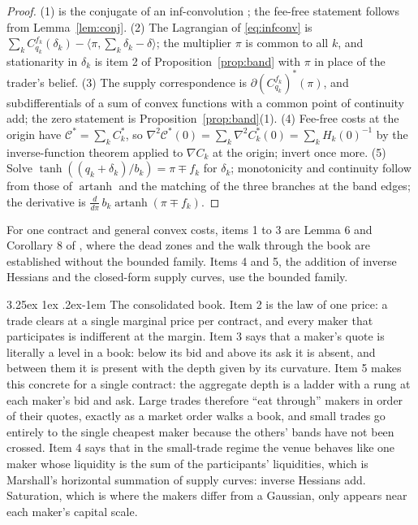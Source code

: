 \documentclass[11pt]{article}
\makeatletter
\renewcommand\paragraph{\@startsection{paragraph}{4}{\z@}%
  {3.25ex \@plus1ex \@minus.2ex}{-1em}%
  {\normalfont\normalsize\itshape}}
\theoremstyle{definition}
\theoremstyle{remark}
\newcommand{\ip}[2]{\langle #1,#2\rangle}
\newcommand{\artanh}{\operatorname{artanh}}
\makeatother
\begin{document}
\begin{proof}
(1) is the conjugate of an inf-convolution \citep[Thm.\ 16.4]{rockafellar1970}; the fee-free statement follows from
Lemma~\ref{lem:conj}. (2) The Lagrangian of \eqref{eq:infconv} is $\sum_kC^{f_k}_{q_k}(\delta_k)-\ip{\pi}{\sum_k\delta_k-\delta}$;
the multiplier $\pi$ is common to all $k$, and stationarity in $\delta_k$ is item 2 of Proposition~\ref{prop:band}
with $\pi$ in place of the trader's belief. (3) The supply correspondence is $\partial(C^{f_k}_{q_k})^{*}(\pi)$, and
subdifferentials of a sum of convex functions with a common point of continuity add; the zero statement is
Proposition~\ref{prop:band}(1). (4) Fee-free costs at the origin have $\mathcal{C}^{*}=\sum_kC_k^{*}$, so
$\nabla^2\mathcal{C}^{*}(0)=\sum_k\nabla^2C_k^{*}(0)=\sum_kH_k(0)^{-1}$ by the inverse-function theorem applied to
$\nabla C_k$ at the origin; invert once more. (5) Solve $\tanh((q_k+\delta_k)/b_k)=\pi\mp f_k$ for $\delta_k$;
monotonicity and continuity follow from those of $\artanh$ and the matching of the three branches at the band edges;
the derivative is $\tfrac{d}{d\pi}\,b_k\artanh(\pi\mp f_k)$.
\end{proof}

For one contract and general convex costs, items 1 to 3 are Lemma 6 and Corollary 8 of
\citet{cotton2026nonconvex}, where the dead zones and the walk through the book are established without the
bounded family. Items 4 and 5, the addition of inverse Hessians and the closed-form supply curves, use the
bounded family.

\paragraph{The consolidated book.} Item 2 is the law of one price: a trade clears at a single marginal price per
contract, and every maker that participates is indifferent at the margin. Item 3 says that a maker's quote is
literally a level in a book: below its bid and above its ask it is absent, and between them it is present with the
depth given by its curvature. Item 5 makes this concrete for a single contract: the aggregate depth is a ladder with
a rung at each maker's bid and ask. Large trades therefore ``eat through'' makers in order of their quotes, exactly
as a market order walks a book, and small trades go entirely to the single cheapest maker because the others' bands
have not been crossed. Item 4 says that in the small-trade regime the venue behaves like one maker whose liquidity is
the sum of the participants' liquidities, which is Marshall's horizontal summation of supply curves: inverse Hessians
add. Saturation, which is where the makers differ from a Gaussian, only appears near each maker's capital scale.
\end{document}
